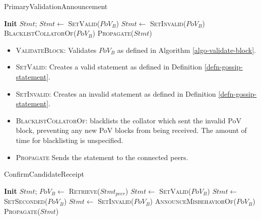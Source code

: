\begin{algorithm}[H]
  \caption[PrimaryValidationAnnouncement]{\sc PrimaryValidationAnnouncement}
  \label{algo-primary-validation-announcement}
  \begin{algorithmic}[1]
      \State \textbf{Init} $Stmt$;
        \State $Stmt \leftarrow$ \textsc{SetValid($PoV_B$)}
      \Else
        \State $Stmt \leftarrow$ \textsc{SetInvalid($PoV_B$)}
        \State \textsc{BlacklistCollatorOf}($PoV_B$)
      \EndIf
      \State \textsc{Propagate}($Stmt$)
  \end{algorithmic}
\end{algorithm}

\begin{itemize}
  \item \textsc{ValidateBlock}: Validates $PoV_B$ as defined in Algorithm
  \ref{algo-validate-block}.
  \item \textsc{SetValid}: Creates a valid statement as defined in Definition
  \ref{defn-gossip-statement}.
  \item \textsc{SetInvalid}: Creates an invalid statement as defined in
  Definition \ref{defn-gossip-statement}.
  \item \textsc{BlacklistCollatorOf}: blacklists the collator which sent the
  invalid PoV block, preventing any new PoV blocks from being received. The
  amount of time for blacklisting is unspecified.
  \item \textsc{Propagate} Sends the statement to the connected peers.
\end{itemize}

\begin{algorithm}[H]
  \caption[]{\sc ConfirmCandidateReceipt}
  \label{algo-endorse-candidate-receipt}
  \begin{algorithmic}[1]
      \State \textbf{Init} $Stmt$;
      \State $PoV_B \leftarrow$ \textsc{Retrieve}($Stmt_{peer}$)
          \State $Stmt \leftarrow$ \textsc{SetValid($PoV_B$)}
        \Else
          \State $Stmt \leftarrow$ \textsc{SetSeconded($PoV_B$)}
        \EndIf
      \Else
        \State $Stmt \leftarrow$ \textsc{SetInvalid($PoV_B$)}
        \State \textsc{AnnounceMisbehaviorOf}($PoV_B$)
      \EndIf
      \State \textsc{Propagate}($Stmt$)
  \end{algorithmic}
\end{algorithm}

